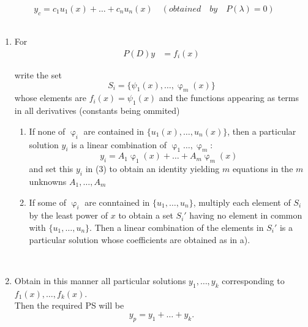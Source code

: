 \documentclass[12pt]{amsbook}
\begin{document}
\[y_c = c_1 u_1(x) + \dots + c_n u_n (x) \quad (obtained \quad by \quad P(\lambda)=0)\]
\\
\begin{enumerate}
    \item For
    \begin{align}
            \label{eq:b2p2_487_firstEquation}
             P(D)y &= f_i(x)
    \end{align}
    
    \noindent write the set
    \[S_i = \{\psi_1(x), \dots , \upvarphi_m(x)\}\]
    whose elements are $f_i(x) = \psi_1(x)$ and the functions appearing as terms in all derivatives (constants being ommited)
    \\
        \begin{enumerate}
            \item If none of $\upvarphi_i$ are contained in $\{u_1(x), \dots , u_n(x)\}$, then a particular solution $y_i$ is a linear combination of $\upvarphi_1 \dots , \upvarphi_m$:
            \[y_i = A_1\upvarphi_1(x) + \dots + A_m\upvarphi_m(x)\]
            and set this $y_i$ in (3) to obtain an identity yielding $m$ equations in the $m$ unknowns $A_1 , \dots , A_m$
            \\
            \item If some of $\upvarphi_i$ are conntained in $\{u_1 , \dots , u_n\}$, multiply each element of $S_i$ by the least power of $x$ to obtain a set $S_i'$ having no element in common with $\{u_1, \dots , u_n\}$. Then a linear combination of the elements in $S_i'$ is a particular solution whose coefficients are obtained as in a).
            \\
        \end{enumerate}
    \\
    \item Obtain in this manner all particular solutions $y_1 , \dots , y_k$ corresponding to $f_1(x) , \dots , f_k(x)$.\\
    Then the required PS will be
    \[y_p = y_1 + \dots + y_k.\]
\end{enumerate}
\end{document}
